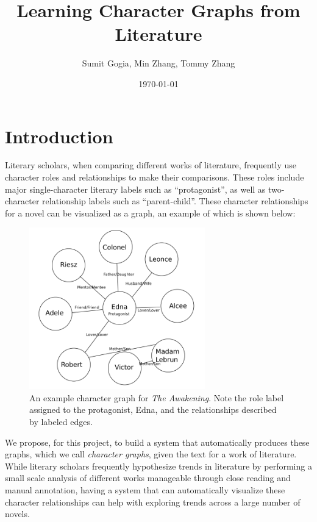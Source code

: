 \documentclass[12pt]{article}
\begin{document}
\title{Learning Character Graphs from Literature}
\author{Sumit Gogia, Min Zhang, Tommy Zhang}
\date{\today}

\maketitle

\section{Introduction}
    Literary scholars, when comparing different works of literature, frequently use character roles and relationships to make their comparisons. These roles include major single-character literary labels such as ``protagonist'', as well as two-character relationship labels such as ``parent-child''. These character relationships for a novel can be visualized as a graph, an example of which is shown below: 

    \begin{figure}[H]
        \centering
        \includegraphics[width=3in]{chara_graph.png}
        \caption{An example character graph for \emph{The Awakening}. Note the role label assigned to the protagonist, Edna, and the relationships described by labeled edges.}
    \end{figure}

    We propose, for this project, to build a system that automatically produces these graphs, which we call \emph{character graphs}, given the text for a work of literature. While literary scholars frequently hypothesize trends in literature by performing a small scale analysis of different works manageable through close reading and manual annotation, having a system that can automatically visualize these character relationships can help with exploring trends across a large number of novels.
\end{document}
